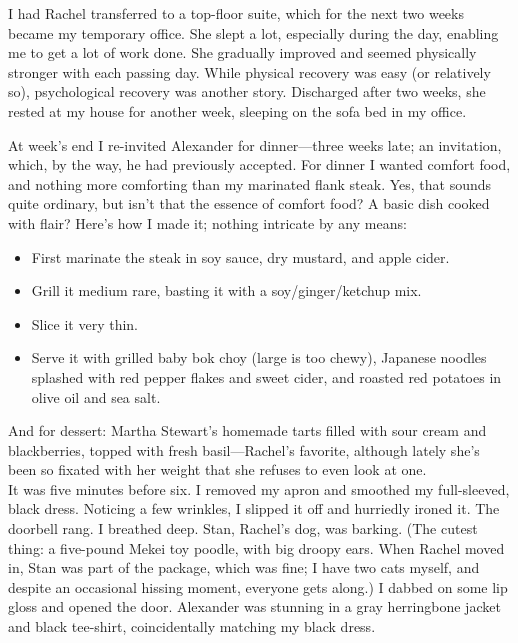 \titlemark

I had Rachel transferred to a top-floor suite, which for the next two
weeks became my temporary office. She slept a lot, especially during the
day, enabling me to get a lot of work done. She gradually improved and
seemed physically stronger with each passing day. While physical
recovery was easy (or relatively so), psychological recovery was another
story. Discharged after two weeks, she rested at my house for another
week, sleeping on the sofa bed in my office.

At week's end I re-invited Alexander for dinner---three weeks late; an
invitation, which, by the way, he had previously accepted. For dinner I
wanted comfort food, and nothing more comforting than my marinated flank
steak. Yes, that sounds quite ordinary, but isn't that the essence of
comfort food? A basic dish cooked with flair? Here's how I made it;
nothing intricate by any means:

\begin{itemize}
\tightlist
\item
  First marinate the steak in soy sauce, dry mustard, and apple cider.
\item
  Grill it medium rare, basting it with a soy/ginger/ketchup mix.
\item
  Slice it very thin.
\item
  Serve it with grilled baby bok choy (large is too chewy), Japanese
  noodles splashed with red pepper flakes and sweet cider, and roasted
  red potatoes in olive oil and sea salt.
\end{itemize}

And for dessert: Martha Stewart's homemade tarts filled with sour cream
and blackberries, topped with fresh basil---Rachel's favorite, although
lately she's been so fixated with her weight that she refuses to even
look at one.\\

It was five minutes before six. I removed my apron and smoothed my
full-sleeved, black dress. Noticing a few wrinkles, I slipped it off and
hurriedly ironed it. The doorbell rang. I breathed deep. Stan, Rachel's
dog, was barking. (The cutest thing: a five-pound Mekei toy poodle, with
big droopy ears. When Rachel moved in, Stan was part of the package,
which was fine; I have two cats myself, and despite an occasional
hissing moment, everyone gets along.) I dabbed on some lip gloss and
opened the door. Alexander was stunning in a gray herringbone jacket and
black tee-shirt, coincidentally matching my black dress.

